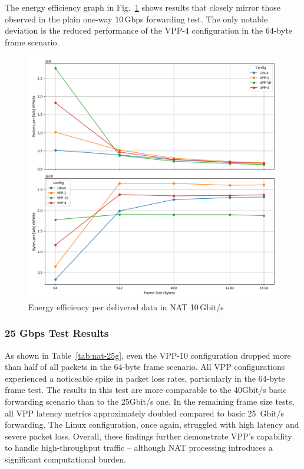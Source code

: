 The energy efficiency graph in Fig.~\ref{fig:nat-10g} shows results that closely mirror those observed in the plain one-way 10\,Gbps forwarding test. 
The only notable deviation is the reduced performance of the VPP-4 configuration in the 64-byte frame scenario.

\begin{figure}[!htbp]
    \centering
    \includegraphics[width=\linewidth]{images/consumption-nat-10g.png}
    \caption{Energy efficiency per delivered data in NAT 10\,Gbit/s}
    \label{fig:nat-10g}
\end{figure}

\subsubsection{25 Gbps Test Results}

As shown in Table~\ref{tab:nat-25g}, even the VPP-10 configuration dropped more than half of all packets in the 64-byte frame scenario. 
All VPP configurations experienced a noticeable spike in packet loss rates, particularly in the 64-byte frame test. 
The results in this test are more comparable to the 40Gbit/s basic forwarding scenario than to the 25Gbit/s one.
In the remaining frame size tests, all VPP latency metrics approximately doubled compared to basic 25~Gbit/s forwarding. The Linux configuration, once again, struggled with high latency and severe packet loss.
Overall, these findings further demonstrate VPP’s capability to handle high-throughput traffic -- although NAT processing introduces a significant computational burden. 

